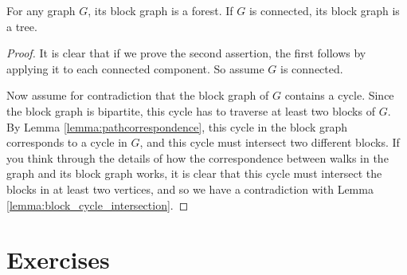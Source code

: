 \documentclass[nobib]{tufte-handout}
\begin{document}
\begin{lemma}
  For any graph $G$, its block graph is a forest. If $G$ is connected, its block graph is a tree.

  \begin{proof}
    It is clear that if we prove the second assertion, the first follows by applying it to each connected component. So assume $G$ is connected.

    Now assume for contradiction that the block graph of $G$ contains a cycle. Since the block graph is bipartite, this cycle has to traverse at least two blocks of $G$. By Lemma \ref{lemma:pathcorrespondence}, this cycle in the block graph corresponds to a cycle in $G$, and this cycle must intersect two different blocks. If you think through the details of how the correspondence between walks in the graph and its block graph works, it is clear that this cycle must intersect the blocks in at least two vertices, and so we have a contradiction with Lemma \ref{lemma:block_cycle_intersection}.
  \end{proof}
\end{lemma}

\section{Exercises}


%
%
\end{document}
